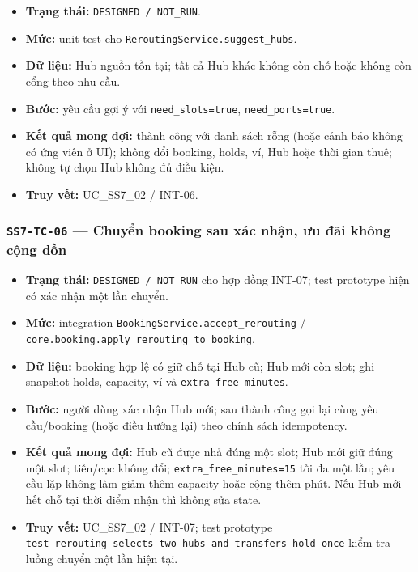 \documentclass[11pt,a4paper]{article}
\providecommand{\tightlist}{%
  \setlength{\itemsep}{0pt}\setlength{\parskip}{0pt}}
\begin{document}
\begin{itemize}
\tightlist
\item
  \textbf{Trạng thái:} \texttt{DESIGNED\ /\ NOT\_RUN}.
\item
  \textbf{Mức:} unit test cho \texttt{ReroutingService.suggest\_hubs}.
\item
  \textbf{Dữ liệu:} Hub nguồn tồn tại; tất cả Hub khác không còn chỗ
  hoặc không còn cổng theo nhu cầu.
\item
  \textbf{Bước:} yêu cầu gợi ý với \texttt{need\_slots=true},
  \texttt{need\_ports=true}.
\item
  \textbf{Kết quả mong đợi:} thành công với danh sách rỗng (hoặc cảnh
  báo không có ứng viên ở UI); không đổi booking, holds, ví, Hub hoặc
  thời gian thuê; không tự chọn Hub không đủ điều kiện.
\item
  \textbf{Truy vết:} UC\_SS7\_02 / INT-06.
\end{itemize}

\hypertarget{ss7-tc-06-chuyux1ec3n-booking-sau-xuxe1c-nhux1eadn-ux1b0u-ux111uxe3i-khuxf4ng-cux1ed9ng-dux1ed3n}{%
\subsubsection{\texorpdfstring{\texttt{SS7-TC-06} --- Chuyển booking sau
xác nhận, ưu đãi không cộng
dồn}{SS7-TC-06 --- Chuyển booking sau xác nhận, ưu đãi không cộng dồn}}\label{ss7-tc-06-chuyux1ec3n-booking-sau-xuxe1c-nhux1eadn-ux1b0u-ux111uxe3i-khuxf4ng-cux1ed9ng-dux1ed3n}}

\begin{itemize}
\tightlist
\item
  \textbf{Trạng thái:} \texttt{DESIGNED\ /\ NOT\_RUN} cho hợp đồng
  INT-07; test prototype hiện có xác nhận một lần chuyển.
\item
  \textbf{Mức:} integration \texttt{BookingService.accept\_rerouting} /
  \texttt{core.booking.apply\_rerouting\_to\_booking}.
\item
  \textbf{Dữ liệu:} booking hợp lệ có giữ chỗ tại Hub cũ; Hub mới còn
  slot; ghi snapshot holds, capacity, ví và
  \texttt{extra\_free\_minutes}.
\item
  \textbf{Bước:} người dùng xác nhận Hub mới; sau thành công gọi lại
  cùng yêu cầu/booking (hoặc điều hướng lại) theo chính sách
  idempotency.
\item
  \textbf{Kết quả mong đợi:} Hub cũ được nhả đúng một slot; Hub mới giữ
  đúng một slot; tiền/cọc không đổi; \texttt{extra\_free\_minutes=15}
  tối đa một lần; yêu cầu lặp không làm giảm thêm capacity hoặc cộng
  thêm phút. Nếu Hub mới hết chỗ tại thời điểm nhận thì không sửa state.
\item
  \textbf{Truy vết:} UC\_SS7\_02 / INT-07; test prototype
  \texttt{test\_rerouting\_selects\_two\_hubs\_and\_transfers\_hold\_once}
  kiểm tra luồng chuyển một lần hiện tại.
\end{itemize}
\end{document}
